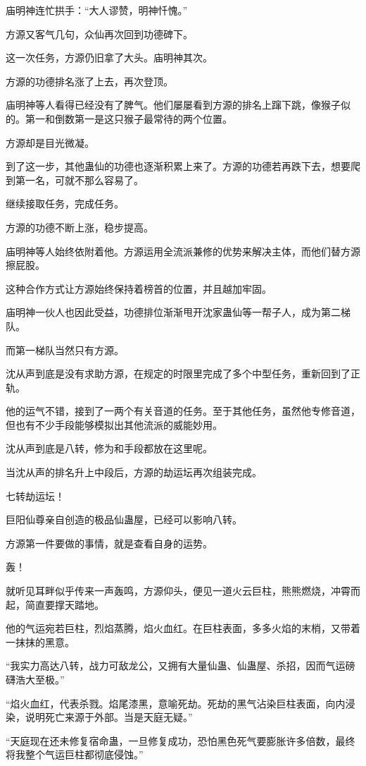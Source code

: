 \begin{this_body}
庙明神连忙拱手：“大人谬赞，明神忏愧。”

方源又客气几句，众仙再次回到功德碑下。

这一次任务，方源仍旧拿了大头。庙明神其次。

方源的功德排名涨了上去，再次登顶。

庙明神等人看得已经没有了脾气。他们屡屡看到方源的排名上蹿下跳，像猴子似的。第一和倒数第一是这只猴子最常待的两个位置。

方源却是目光微凝。

到了这一步，其他蛊仙的功德也逐渐积累上来了。方源的功德若再跌下去，想要爬到第一名，可就不那么容易了。

继续接取任务，完成任务。

方源的功德不断上涨，稳步提高。

庙明神等人始终依附着他。方源运用全流派兼修的优势来解决主体，而他们替方源擦屁股。

这种合作方式让方源始终保持着榜首的位置，并且越加牢固。

庙明神一伙人也因此受益，功德排位渐渐甩开沈家蛊仙等一帮子人，成为第二梯队。

而第一梯队当然只有方源。

沈从声到底是没有求助方源，在规定的时限里完成了多个中型任务，重新回到了正轨。

他的运气不错，接到了一两个有关音道的任务。至于其他任务，虽然他专修音道，但也有不少手段能够模拟出其他流派的威能妙用。

沈从声到底是八转，修为和手段都放在这里呢。

当沈从声的排名升上中段后，方源的劫运坛再次组装完成。

七转劫运坛！

巨阳仙尊亲自创造的极品仙蛊屋，已经可以影响八转。

方源第一件要做的事情，就是查看自身的运势。

轰！

就听见耳畔似乎传来一声轰鸣，方源仰头，便见一道火云巨柱，熊熊燃烧，冲霄而起，简直要撑天踏地。

他的气运宛若巨柱，烈焰蒸腾，焰火血红。在巨柱表面，多多火焰的末梢，又带着一抹抹的黑意。

“我实力高达八转，战力可敌龙公，又拥有大量仙蛊、仙蛊屋、杀招，因而气运磅礴浩大至极。”

“焰火血红，代表杀戮。焰尾漆黑，意喻死劫。死劫的黑气沾染巨柱表面，向内浸染，说明死亡来源于外部。当是天庭无疑。”

“天庭现在还未修复宿命蛊，一旦修复成功，恐怕黑色死气要膨胀许多倍数，最终将我整个气运巨柱都彻底侵蚀。”


\end{this_body}
